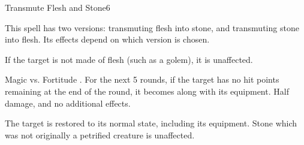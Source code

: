 \begin{spellsection}{Transmute Flesh and Stone}{6}
    \begin{spellheader}
    \end{spellheader}
    \begin{spellcontent}
        \begin{spelltargetinginfo}
            \spellspecial This spell has two versions: transmuting flesh into stone, and transmuting stone into flesh. Its effects depend on which version is chosen.
        \end{spelltargetinginfo}
    \end{spellcontent}
    \begin{spellsubcontent}
        \begin{spelltargetinginfo}
        \end{spelltargetinginfo}
        \begin{spelleffects}
            \spellspecial If the target is not made of flesh (such as a golem), it is unaffected.
            \begin{spellattack}{Magic vs. Fortitude}
                \spellsuccess {}. For the next 5 rounds, if the target has no hit points remaining at the end of the round, it becomes \petrified along with its equipment.
                \spellfailure Half damage, and no additional effects.
            \end{spellattack}
        \end{spelleffects}
    \end{spellsubcontent}
    \begin{spellsubcontent}
        \begin{spelltargetinginfo}
        \end{spelltargetinginfo}
        \begin{spelleffects}
            \spelleffect The target is restored to its normal state, including its equipment. Stone which was not originally a petrified creature is unaffected.
        \end{spelleffects}
    \end{spellsubcontent}
    \begin{spellfooter}
        \miscastrandom
    \end{spellfooter}
\end{spellsection}

